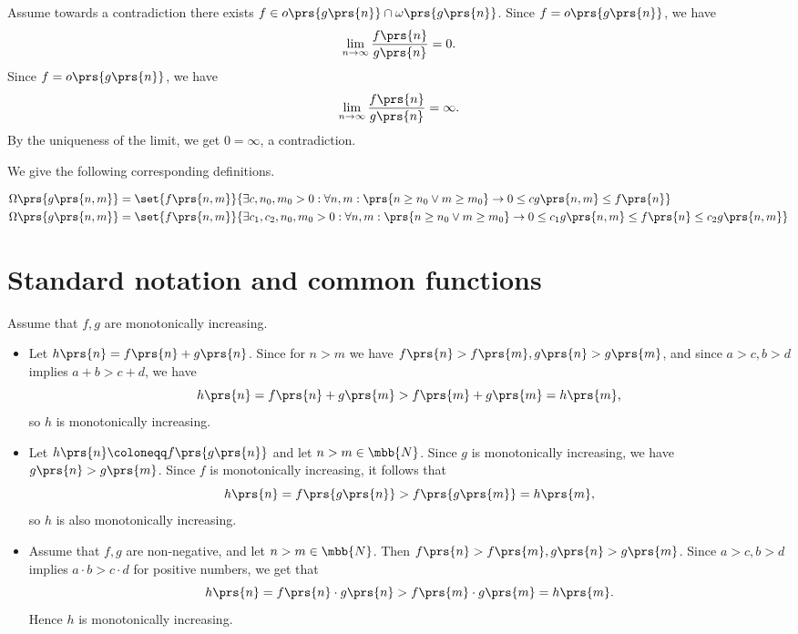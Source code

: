 \documentclass[oneside]{scrbook}
\theoremstyle{definition}
\begin{document}
\begin{exercise}
    Assume towards a contradiction there exists $f \in o\prs{g\prs{n}} \cap \omega\prs{g\prs{n}}$.
    Since $f = o\prs{g\prs{n}}$, we have
    \begin{align*}
        \lim_{n\to\infty} \frac{f\prs{n}}{g\prs{n}} = 0 \text{.}
    \end{align*}
        Since $f = o\prs{g\prs{n}}$, we have
    \begin{align*}
        \lim_{n\to\infty} \frac{f\prs{n}}{g\prs{n}} = \infty \text{.}
    \end{align*}
    By the uniqueness of the limit, we get $0 = \infty$, a contradiction.
\end{exercise}

\begin{exercise}
    We give the following corresponding definitions.

    \begin{align*}
        \Omega\prs{g\prs{n,m}} &= \set{f\prs{n,m}}{\exists c, n_0, m_0 > 0 : \forall n,m: \prs{n \geq n_0 \vee m \geq m_0} \to 0 \leq c g\prs{n,m} \leq f\prs{n}}
        \\
        \Omega\prs{g\prs{n,m}} &= \set{f\prs{n,m}}{\exists c_1,c_2, n_0, m_0 > 0 : \forall n,m: \prs{n \geq n_0 \vee m \geq m_0} \to 0 \leq c_1 g\prs{n,m} \leq f\prs{n} \leq c_2 g\prs{n,m}}
    \end{align*}
\end{exercise}

\section{Standard notation and common functions}

\begin{exercise}
    Assume that $f, g$ are monotonically increasing.

    \begin{itemize}
        \item Let $h\prs{n} = f\prs{n} + g\prs{n}$. Since for $n > m$ we have $f\prs{n} > f\prs{m}, g\prs{n} > g\prs{m}$, and since $a > c, b > d$ implies $a+b > c+d$, we have
        \[h\prs{n} = f\prs{n} + g\prs{m} > f\prs{m} + g\prs{m} = h\prs{m} \text{,}\]
        so $h$ is monotonically increasing.

        \item Let $h\prs{n} \coloneqq f\prs{g\prs{n}}$ and let $n > m \in \mbb{N}$. Since $g$ is monotonically increasing, we have $g\prs{n} > g\prs{m}$. Since $f$ is monotonically increasing, it follows that \[h\prs{n} = f\prs{g\prs{n}} > f\prs{g\prs{m}} = h\prs{m}\text{,}\] so $h$ is also monotonically increasing.

        \item Assume that $f,g$ are non-negative, and let $n > m \in \mbb{N}$.
        Then $f\prs{n} > f\prs{m}, g\prs{n} > g\prs{m}$. Since $a > c, b > d$ implies $a \cdot b > c \cdot d$ for positive numbers, we get that
        \[h\prs{n} = f\prs{n} \cdot g\prs{n} > f\prs{m} \cdot g\prs{m} = h\prs{m} \text{.}\]
        Hence $h$ is monotonically increasing.
    \end{itemize}
\end{exercise}
\end{document}
